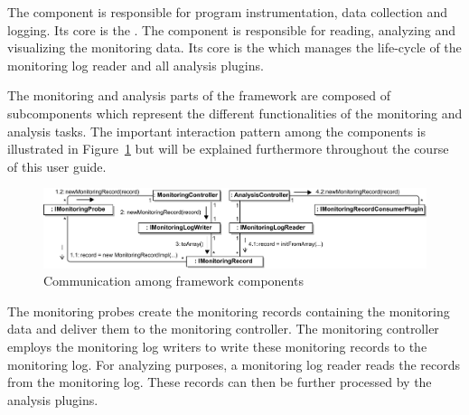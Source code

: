 \noindent The \KiekerMonitoringPart{} component is responsible for program instrumentation, data collection and logging. Its core is the . %
%
The component \KiekerAnalysisPart{} is responsible for reading, analyzing and visualizing the monitoring data. Its core is the  which manages the life-cycle of the monitoring log reader and all analysis plugins.

The monitoring and analysis parts of the \Kieker{} framework are composed of subcomponents which represent the different functionalities of the monitoring and analysis tasks. The important interaction pattern among the components is illustrated in Figure~\ref{fig:KiekerCommunicationDiagram} but will be explained furthermore throughout the course of this user guide. 

\vspace{1cm}

\begin{figure}[H]\centering
\includegraphics[width=1\textwidth]{images/kiekerCommunications-revisedReArranged-woMonitoringLog-bw-newNames}
\caption{Communication among \Kieker{} framework components}
\label{fig:KiekerCommunicationDiagram}
\end{figure}

\vspace{1cm}

\noindent The monitoring probes create the monitoring records containing the %
monitoring data and deliver them to the monitoring controller. %
The monitoring controller employs the monitoring log writers to write these %
monitoring records to the monitoring log. %
For analyzing purposes, a monitoring log reader reads the records from the monitoring log. %
These records can then be further processed by the analysis plugins.


